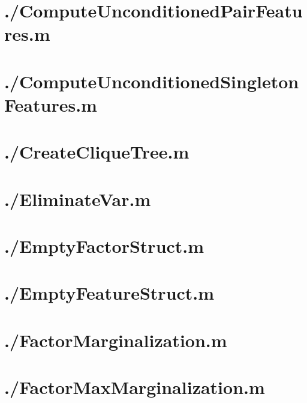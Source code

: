 \documentclass{article}
\begin{document}
\section{./ComputeUnconditionedPairFeatures.m}

\section{./ComputeUnconditionedSingletonFeatures.m}

\section{./CreateCliqueTree.m}

\section{./EliminateVar.m}

\section{./EmptyFactorStruct.m}

\section{./EmptyFeatureStruct.m}

\section{./FactorMarginalization.m}

\section{./FactorMaxMarginalization.m}

\end{document}
